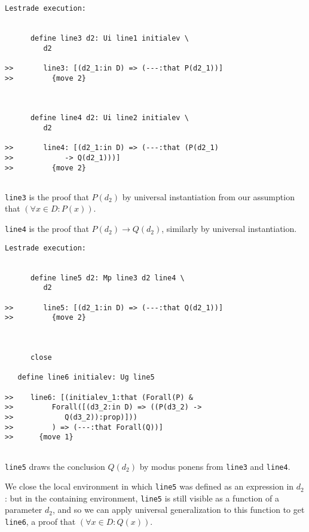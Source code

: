\documentclass{slides}
\begin{document}
\begin{slide}

{\tiny

\begin{verbatim}Lestrade execution:


      define line3 d2: Ui line1 initialev \
         d2

>>       line3: [(d2_1:in D) => (---:that P(d2_1))]
>>         {move 2}



      define line4 d2: Ui line2 initialev \
         d2

>>       line4: [(d2_1:in D) => (---:that (P(d2_1)
>>            -> Q(d2_1)))]
>>         {move 2}


\end{verbatim}

}

\end{slide}

{\tt line3} is the proof that $P(d_2)$ by universal instantiation from our assumption that $(\forall x \in D:P(x))$.

{\tt line4} is the proof that $P(d_2) \rightarrow Q(d_2)$, similarly by universal instantiation.

\begin{slide}
{\tiny
\begin{verbatim}Lestrade execution:


      define line5 d2: Mp line3 d2 line4 \
         d2

>>       line5: [(d2_1:in D) => (---:that Q(d2_1))]
>>         {move 2}



      close

   define line6 initialev: Ug line5

>>    line6: [(initialev_1:that (Forall(P) &
>>         Forall([(d3_2:in D) => ((P(d3_2) ->
>>            Q(d3_2)):prop)]))
>>         ) => (---:that Forall(Q))]
>>      {move 1}


\end{verbatim}
}

\end{slide}

{\tt line5} draws the conclusion $Q(d_2)$ by modus ponens from {\tt line3} and {\tt line4}.

We close the local environment in which {\tt line5} was defined as an expression in $d_2$:  but in the containing environment,
{\tt line5} is still visible as a function of a parameter $d_2$, and so we can apply universal generalization to this function to get
{\tt line6}, a proof that $(\forall x \in D:Q(x))$.
\end{document}
